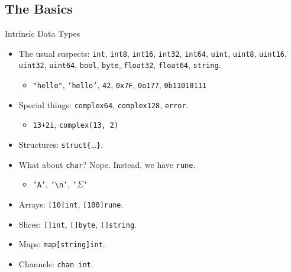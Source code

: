 \documentclass[pdf,t]{beamer}
\newcommand\z[1]{\texttt{#1}}
\newcommand\identifier[1]{{\color{green!70!black}\z{#1}}}
\newcommand\keyword[1]{{\color{blue}\z{#1}}}
\newcommand\gostring[1]{{\color{orange!90!black}\z{#1}}}
\begin{document}
\subsection{The Basics}
\begin{frame}{Intrinsic Data Types}
    \begin{itemize}
        \item The usual suspects: 
            \keyword{int}, 
            \keyword{int8}, 
            \keyword{int16}, 
            \keyword{int32}, 
            \keyword{int64}, 
            \keyword{uint}, 
            \keyword{uint8}, 
            \keyword{uint16}, 
            \keyword{uint32}, 
            \keyword{uint64}, 
            \keyword{bool},
            \keyword{byte},
            \keyword{float32},
            \keyword{float64},
            \keyword{string}.
            \begin{itemize}
                \item \gostring{"hello"}, \gostring{`hello`}, \z{42}, \z{0x7F}, \z{0o177}, \z{0b11010111}
            \end{itemize}
            \pause
        \item Special things:
            \keyword{complex64},
            \keyword{complex128},
            \keyword{error}.
            \begin{itemize}
                \item \z{13+2i}, \identifier{complex}\z{(13, 2)}
            \end{itemize}
            \pause
        \item Structures: \keyword{struct}\z{\{}\dots\z{\}}.
            \pause
        \item What about \keyword{char}? Nope. Instead, we have \keyword{rune}.
            \begin{itemize}
                \item \gostring{'A'}, \gostring{'\textbackslash n'}, \gostring{'$\Sigma$'}
            \end{itemize}
            \pause
        \item Arrays: \z{[10]}\keyword{int}, \z{[100]}\keyword{rune}.
            \pause
        \item Slices: \z{[]}\keyword{int}, \z{[]}\keyword{byte}, \z{[]}\keyword{string}.
            \pause
        \item Maps: \keyword{map}\z{[}\keyword{string}\z{]}\keyword{int}.
            \pause
        \item Channels: \keyword{chan int}.
    \end{itemize}
\end{frame}
\end{document}
